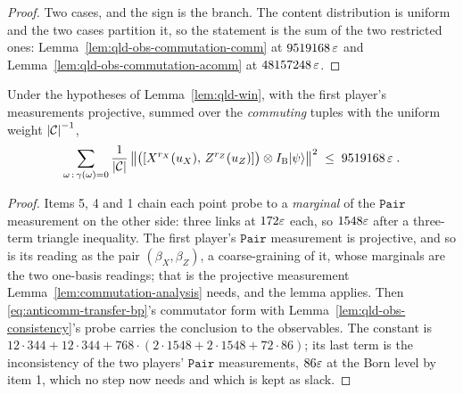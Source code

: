 \begin{proof}
\leanok
{}
Two cases, and the sign is the branch. The content distribution is uniform and the two cases
partition it, so the statement is the sum of the two restricted ones:
Lemma~\ref{lem:qld-obs-commutation-comm} at $9519168\,\varepsilon$ and
Lemma~\ref{lem:qld-obs-commutation-acomm} at $48157248\,\varepsilon$.
\end{proof}

\effortMedium

\begin{lemma}
\label{lem:qld-obs-commutation-comm}
\leanok
Under the hypotheses of Lemma~\ref{lem:qld-win}, with the first player's measurements projective,
summed over the \emph{commuting} tuples with the uniform weight $\left\vert {\ensuremath{\mathcal{C}}} \right\vert^{-1}$,
\begin{equation*}
  \sum_{\omega \,:\, \gamma(\omega) = 0} \frac{1}{\left\vert {\ensuremath{\mathcal{C}}} \right\vert}
    \left\| {\bigl( [X^{r_X}(u_X),\, Z^{r_Z}(u_Z)] \bigr) \otimes I_{\textsc{B}} |\psi\rangle} \right\|^2
  \;\leq\; 9519168\, \varepsilon\;.
\end{equation*}
\end{lemma}

\begin{proof}
\leanok
{}
Items 5, 4 and 1 chain each point probe to a \emph{marginal} of the $\mathtt{Pair}$ measurement on
the other side: three links at $172\varepsilon$ each, so $1548\varepsilon$ after a three-term triangle
inequality. The first player's $\mathtt{Pair}$ measurement is projective, and so is its reading as
the pair $(\beta_X, \beta_Z)$, a coarse-graining of it, whose marginals are the two one-basis
readings; that is the projective measurement Lemma~\ref{lem:commutation-analysis} needs, and the
lemma applies. Then \eqref{eq:anticomm-transfer-bp}'s commutator form with
Lemma~\ref{lem:qld-obs-consistency}'s probe carries the conclusion to the observables. The constant
is $12 \cdot 344 + 12 \cdot 344 + 768 \cdot (2 \cdot 1548 + 2 \cdot 1548 + 72 \cdot 86)$; its last
term is the inconsistency of the two players' $\mathtt{Pair}$ measurements, $86\varepsilon$ at the Born
level by item 1, which no step now needs and which is kept as slack.
\end{proof}

